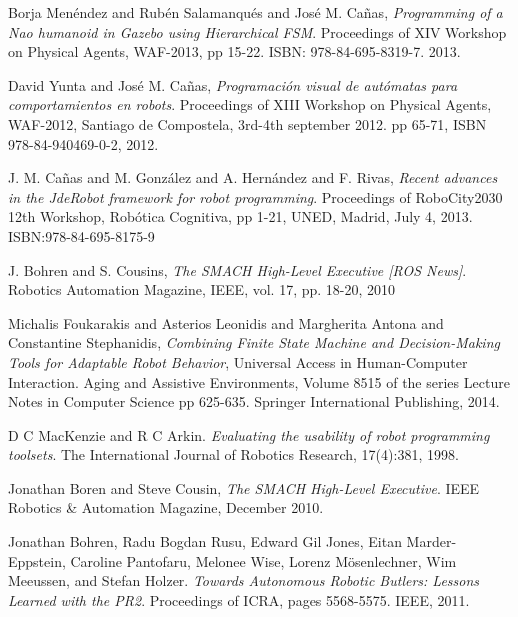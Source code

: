 \documentclass[journal,twoside]{JoPhA}
\begin{document}
\begin{thebibliography}{1}


Borja Men\'endez and Rubén Salamanqu\'es and Jos\'e M. Ca\~nas, \emph{Programming of a Nao humanoid in Gazebo using Hierarchical FSM}.  Proceedings of XIV Workshop on Physical Agents, WAF-2013, pp 15-22. ISBN: 978-84-695-8319-7. 2013.

David Yunta and Jos\'e M. Cañas, \emph{Programación visual de autómatas para comportamientos en robots}.  Proceedings of XIII Workshop on Physical Agents, WAF-2012, Santiago de Compostela, 3rd-4th september 2012. pp 65-71, ISBN 978-84-940469-0-2, 2012.

J. M. Ca\~nas and M. Gonz\'alez and A. Hern\'andez and F. Rivas, \emph{Recent advances in the JdeRobot framework for robot programming}. Proceedings of RoboCity2030 12th Workshop, Rob\'otica Cognitiva, pp 1-21, UNED, Madrid, July 4, 2013. ISBN:978-84-695-8175-9

J.  Bohren  and  S.  Cousins, \emph{The  SMACH  High-Level Executive  [ROS  News]}. Robotics Automation Magazine, IEEE, vol. 17, pp. 18-20, 2010

Michalis Foukarakis and Asterios Leonidis and Margherita Antona and Constantine Stephanidis, \emph{Combining Finite State Machine and Decision-Making Tools for Adaptable Robot Behavior}, Universal Access in Human-Computer Interaction. Aging and Assistive Environments, Volume 8515 of the series Lecture Notes in Computer Science pp 625-635. Springer International Publishing, 2014.

D C MacKenzie and R C Arkin. \emph{Evaluating the usability of robot programming toolsets}. The International Journal of Robotics Research, 17(4):381, 1998.

Jonathan Boren and Steve Cousin, \emph{The SMACH High-Level Executive}. IEEE Robotics \& Automation Magazine, December 2010.

Jonathan Bohren, Radu Bogdan Rusu, Edward Gil Jones, Eitan Marder-Eppstein, Caroline Pantofaru, Melonee Wise, Lorenz Mösenlechner, Wim Meeussen, and Stefan Holzer. \emph{Towards  Autonomous  Robotic  Butlers:  Lessons  Learned  with  the  PR2}. Proceedings of ICRA, pages 5568-5575. IEEE, 2011.


\end{thebibliography}
\end{document}
